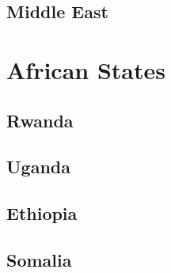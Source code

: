 \subsection*{Middle East}

\section{African States}

\subsection*{Rwanda}

\subsection*{Uganda}

\subsection*{Ethiopia}

\subsection*{Somalia}
